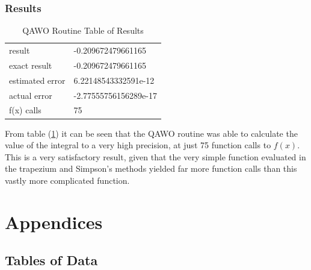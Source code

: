 \documentclass[pdf,color]{UoBnote}
\begin{document}
			\subsubsection{Results}
			
			\begin{table}[H]\label{tab:qawo-results}
		\centering
		\caption{QAWO Routine Table of Results}
    \begin{tabular}{|l|l|}
    \hline
    result          & -0.209672479661165    \\
    exact result    & -0.209672479661165    \\
    estimated error & 6.22148543332591e-12 \\
    actual error    & -2.77555756156289e-17 \\
    f(x) calls      & 75                   \\
    \hline
    \end{tabular}
\end{table}			
		
		From table (\ref{tab:qawo-results}) it can be seen that the QAWO routine was able to calculate the value of the integral to a very high precision, at just 75 function calls to $f(x)$.\\
			This is a very satisfactory result, given that the very simple function evaluated in the trapezium and Simpson's methods yielded far more function calls than this vastly more complicated function.\\
			
\section{Appendices}

	\subsection{Tables of Data}
\end{document}
